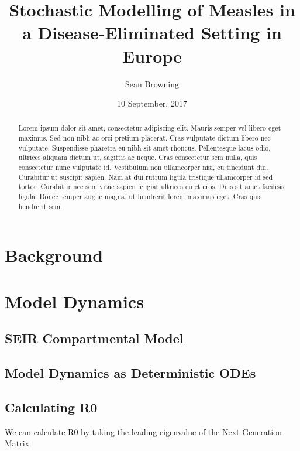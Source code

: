 \documentclass[12pt, a4paper]{article}
\begin{document}
\title{Stochastic Modelling of Measles in a Disease-Eliminated Setting in Europe}
\author{Sean Browning}
\date{10 September, 2017}
\maketitle
\begin{abstract}
Lorem ipsum dolor sit amet, consectetur adipiscing elit. Mauris semper vel libero
eget maximus. Sed non nibh ac orci pretium placerat. Cras vulputate dictum libero
nec vulputate. Suspendisse pharetra eu nibh sit amet rhoncus. Pellentesque lacus
odio, ultrices aliquam dictum ut, sagittis ac neque. Cras consectetur sem nulla,
quis consectetur nunc vulputate id. Vestibulum non ullamcorper nisi, eu tincidunt
dui. Curabitur ut suscipit sapien. Nam at dui rutrum ligula tristique ullamcorper
id sed tortor. Curabitur nec sem vitae sapien feugiat ultrices eu et eros.
Duis sit amet facilisis ligula. Donec semper augue magna, ut hendrerit lorem
maximus eget. Cras quis hendrerit sem.
\end{abstract}
\clearpage
\tableofcontents
\clearpage
\section{Background}

\section{Model Dynamics}
\subsection{SEIR Compartmental Model}

\subsection{Model Dynamics as Deterministic ODEs}

\subsection{Calculating R0}
\par
We can calculate R0 by taking the leading eigenvalue of the Next Generation Matrix
\clearpage
\end{document}
